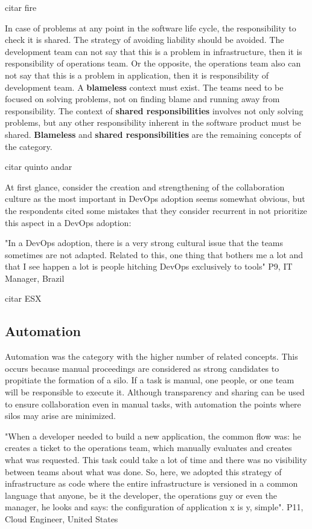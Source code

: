 citar fire

In case of problems at any point in the software life cycle, the responsibility
to check it is shared. The strategy of avoiding liability should be avoided.
The development team can not say that this is a problem in infrastructure, then
it is responsibility of operations team. Or the opposite, the operations team
also can not say that this is a problem in application, then it is
responsibility of development team. A \textbf{blameless} context must exist.
The teams need to be focused on solving problems, not on finding blame and
running away from responsibility. The context of \textbf{shared
responsibilities} involves not only solving problems, but any other
responsibility inherent in the software product must be shared.
\textbf{Blameless} and \textbf{shared responsibilities} are the remaining
concepts of the category.

citar quinto andar

At first glance, consider the creation and strengthening of the collaboration
culture as the most important in DevOps adoption seems somewhat obvious, but
the respondents cited some mistakes that they consider recurrent in not
prioritize this aspect in a DevOps adoption:

"In a DevOps adoption, there is a very strong cultural issue that the teams
sometimes are not adapted. Related to this, one thing that bothers me a lot and
that I see happen a lot is people hitching DevOps exclusively to tools" P9, IT
Manager, Brazil

citar ESX

\subsection{Automation} \label{ssec:automation}
Automation was the category with the higher number of related concepts. This
occurs because manual proceedings are considered as strong candidates to
propitiate the formation of a silo. If a task is manual, one people, or one
team will be responsible to execute it. Although transparency and sharing can
be used to ensure collaboration even in manual tasks, with automation the
points where silos may arise are minimized.

"When a developer needed to build a new application, the common flow was: he
creates a ticket to the operations team, which manually evaluates and creates
what was requested. This task could take a lot of time and there was no
visibility between teams about what was done. So, here, we adopted this
strategy of infrastructure as code where the entire infrastructure is versioned
in a common language that anyone, be it the developer, the operations guy or
even the manager, he looks and says: the configuration of application x is y,
simple". P11, Cloud Engineer, United States

